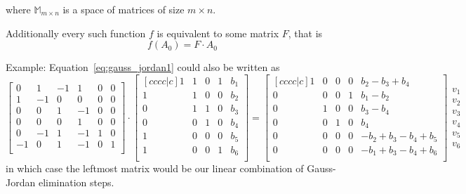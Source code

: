 \begin{description}
\begin{description}
            where $\mathbb{M}_{m \times n}$ is a space of matrices of size $m \times n$.

            Additionally every such function $f$ is equivalent to some matrix $F$, that is
            \begin{equation}
                f(A_0) = F \cdot A_0
            \end{equation}

            Example: Equation~\ref{eq:gauss_jordan1} could also be written as
            \begin{equation}
            \begin{bmatrix}
                0 & 1 & -1 & 1 & 0 & 0 \\
                1 & -1 & 0 & 0 & 0 & 0 \\
                0 & 0 & 1 & -1 & 0 & 0 \\ 
                0 & 0 & 0 & 1 & 0 & 0 \\ 
                0 & -1 & 1 & -1 & 1 & 0 \\ 
                -1 & 0 & 1 & -1 & 0 & 1 \\ 
            \end{bmatrix} \cdot
            \begin{bmatrix}[cccc|c]
                1 & 1 & 0 & 1 & b_1 \\
                1 & 1 & 0 & 0 & b_2 \\
                0 & 1 & 1 & 0 & b_3 \\ 
                0 & 0 & 1 & 0 & b_4 \\ 
                1 & 0 & 0 & 0 & b_5 \\ 
                1 & 0 & 0 & 1 & b_6 \\ 
            \end{bmatrix} =
            \begin{bmatrix}[cccc|c]
                1 & 0 & 0 & 0 & b_2 - b_3 + b_4 \\
                0 & 0 & 0 & 1 & b_1 - b_2 \\
                0 & 1 & 0 & 0 & b_3 - b_4 \\ 
                0 & 0 & 1 & 0 & b_4 \\ 
                0 & 0 & 0 & 0 & -b_2 + b_3 - b_4 + b_5 \\ 
                0 & 0 & 0 & 0 & -b_1 + b_3 - b_4 + b_6 \\ 
            \end{bmatrix}
            \begin{matrix}
            v_1 \\ v_2 \\ v_3 \\ v_4 \\ v_5 \\ v_6
            \end{matrix}
            \label{eq:gauss_jordan2}
            \end{equation}
            in which case the leftmost matrix would be our linear combination of Gauss-Jordan elimination steps.


\end{description}
\end{description}
